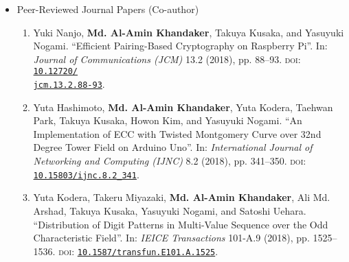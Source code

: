 \begin{itemize}
\vspace{10mm}
\Large
\item Peer-Reviewed Journal Papers  (Co-author)
\normalsize

\begin{enumerate}
	\normalsize
	\item Yuki Nanjo, \textbf{Md. Al-Amin Khandaker}, Takuya Kusaka, and Yasuyuki Nogami. “Efficient Pairing-Based Cryptography on Raspberry Pi”. In: \textit{Journal of Communications (JCM)} 13.2 (2018), pp. 88–93. \textsc{doi}: \href{https://doi.org/10.12720/jcm.13.2.88-93}{\texttt{10.12720/\\jcm.13.2.88-93}}.

	\normalsize
	\item Yuta Hashimoto, \textbf{Md. Al-Amin Khandaker}, Yuta Kodera, Taehwan Park, Takuya Kusaka, Howon Kim, and Yasuyuki Nogami. ``An Implementation of ECC with Twisted Montgomery Curve over 32nd Degree Tower Field on Arduino Uno''. In: \textit{International Journal of Networking and Computing (IJNC)} 8.2 (2018), pp. 341–350. \textsc{doi}: \href{https://doi.org/10.15803/ijnc.8.2_341}{\texttt{10.15803/ijnc.8.2\_341}}.
	
	\normalsize
	\item Yuta Kodera, Takeru Miyazaki, \textbf{Md. Al-Amin Khandaker}, Ali Md. Arshad, Takuya Kusaka, Yasuyuki Nogami, and Satoshi Uehara. ``Distribution of Digit Patterns in Multi-Value Sequence over the Odd Characteristic Field''. In: \textit{IEICE Transactions} 101-A.9 (2018), pp. 1525–1536. \textsc{doi}: \href{https://doi.org/10.1587/transfun.E101.A.1525}{\texttt{10.1587/transfun.E101.A.1525}}.
	

\end{enumerate}
\end{itemize}
